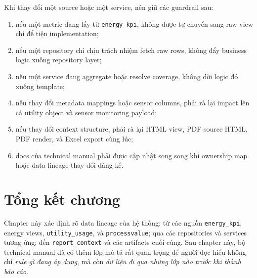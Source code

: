 Khi thay đổi một source hoặc một service, nên giữ các guardrail sau:

\begin{enumerate}[label=-]
\item nếu một metric đang lấy từ \texttt{energy\_kpi}, không được tự chuyển sang raw view chỉ để tiện implementation;
\item nếu một repository chỉ chịu trách nhiệm fetch raw rows, không đẩy business logic xuống repository layer;
\item nếu một service đang aggregate hoặc resolve coverage, không dời logic đó xuống template;
\item nếu thay đổi metadata mappings hoặc sensor columns, phải rà lại impact lên cả utility object và sensor monitoring payload;
\item nếu thay đổi context structure, phải rà lại HTML view, PDF source HTML, PDF render, và Excel export cùng lúc;
\item docs của technical manual phải được cập nhật song song khi ownership map hoặc data lineage thay đổi đáng kể.
\end{enumerate}

\section{Tổng kết chương}

Chapter này xác định rõ data lineage của hệ thống: từ các nguồn \texttt{energy\_kpi}, energy views, \texttt{utility\_usage}, và \texttt{processvalue}; qua các repositories và services tương ứng; đến \texttt{report\_context} và các artifacts cuối cùng. Sau chapter này, bộ technical manual đã có thêm lớp mô tả rất quan trọng để người đọc hiểu không chỉ \textit{rule gì đang áp dụng}, mà còn \textit{dữ liệu đi qua những lớp nào trước khi thành báo cáo}. 
